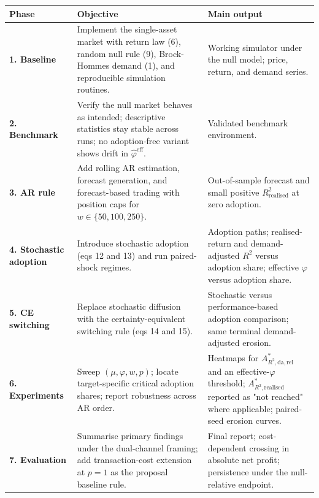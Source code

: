 \documentclass[11pt]{article}
\begin{document}
\begin{center}
\small
\setlength{\tabcolsep}{5pt}
\renewcommand{\arraystretch}{1.18}
\begin{tabularx}{\textwidth}{@{}>{\RaggedRight\arraybackslash}p{}YY@{}}
\toprule
\textbf{Phase} & \textbf{Objective} & \textbf{Main output} \\
\midrule
\textbf{1. Baseline} &
Implement the single-asset market with return law (6), random null rule (9), Brock-Hommes demand (1), and reproducible simulation routines. &
Working simulator under the null model; price, return, and demand series. \\
\midrule
\textbf{2. Benchmark} &
Verify the null market behaves as intended; descriptive statistics stay stable across runs; no adoption-free variant shows drift in $\hat{\varphi}^{\mathrm{eff}}$. &
Validated benchmark environment. \\
\midrule
\textbf{3. AR rule} &
Add rolling AR estimation, forecast generation, and forecast-based trading with position caps for $w \in \{50, 100, 250\}$. &
Out-of-sample forecast and small positive $R^{2}_{\mathrm{realised}}$ at zero adoption. \\
\midrule
\textbf{4. Stochastic adoption} &
Introduce stochastic adoption (eqs 12 and 13) and run paired-shock regimes. &
Adoption paths; realised-return and demand-adjusted $R^{2}$ versus adoption share; effective $\varphi$ versus adoption share. \\
\midrule
\textbf{5. CE switching} &
Replace stochastic diffusion with the certainty-equivalent switching rule (eqs 14 and 15). &
Stochastic versus performance-based adoption comparison; same terminal demand-adjusted erosion. \\
\midrule
\textbf{6. Experiments} &
Sweep $(\mu, \varphi, w, p)$; locate target-specific critical adoption shares; report robustness across AR order. &
Heatmaps for $A^{*}_{R^{2},\mathrm{da},\mathrm{rel}}$ and an effective-$\varphi$ threshold; $A^{*}_{R^{2},\mathrm{realised}}$ reported as "not reached" where applicable; paired-seed erosion curves. \\
\midrule
\textbf{7. Evaluation} &
Summarise primary findings under the dual-channel framing; add transaction-cost extension at $p = 1$ as the proposal baseline rule. &
Final report; cost-dependent crossing in absolute net profit; persistence under the null-relative endpoint. \\
\bottomrule
\end{tabularx}
\end{center}
\end{document}
